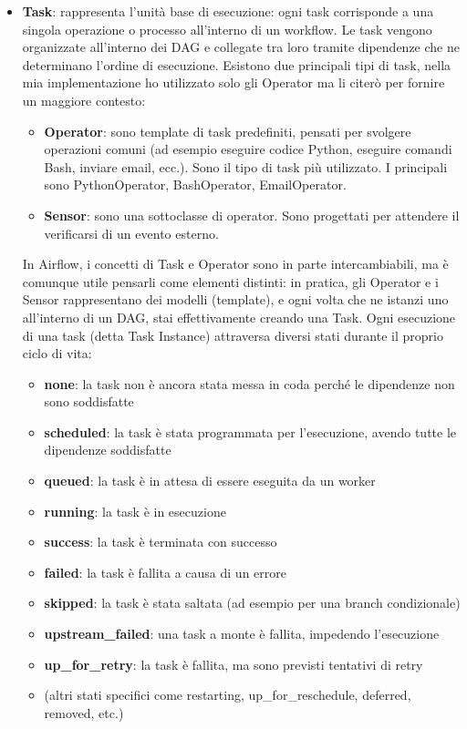 \begin{itemize}
    \item \textbf{Task}: rappresenta l'unità base di esecuzione: ogni task corrisponde a una singola operazione o processo all'interno di un workflow. Le task vengono organizzate all'interno dei DAG e collegate tra loro tramite dipendenze che ne determinano l'ordine di esecuzione. 
    Esistono due principali tipi di task, nella mia implementazione ho utilizzato solo gli Operator ma li citerò per fornire un maggiore contesto:
    \begin{itemize}
        \item \textbf{Operator}: sono template di task predefiniti, pensati per svolgere operazioni comuni (ad esempio eseguire codice Python, eseguire comandi Bash, inviare email, ecc.). Sono il tipo di task più utilizzato. I principali sono PythonOperator, BashOperator, EmailOperator.
        \item \textbf{Sensor}: sono una sottoclasse di operator. Sono progettati per attendere il verificarsi di un evento esterno.
    \end{itemize}

    In Airflow, i concetti di Task e Operator sono in parte intercambiabili, ma è comunque utile pensarli come elementi distinti: in pratica, gli Operator e i Sensor rappresentano dei modelli (template), e ogni volta che ne istanzi uno all'interno di un DAG, stai effettivamente creando una Task.
    Ogni esecuzione di una task (detta Task Instance) attraversa diversi stati durante il proprio ciclo di vita:
    \begin{itemize}
        \item \textbf{none}: la task non è ancora stata messa in coda perché le dipendenze non sono soddisfatte
        \item \textbf{scheduled}: la task è stata programmata per l'esecuzione, avendo tutte le dipendenze soddisfatte
        \item \textbf{queued}: la task è in attesa di essere eseguita da un worker
        \item \textbf{running}: la task è in esecuzione
        \item \textbf{success}: la task è terminata con successo
        \item \textbf{failed}: la task è fallita a causa di un errore
        \item \textbf{skipped}: la task è stata saltata (ad esempio per una branch condizionale)
        \item \textbf{upstream\_failed}: una task a monte è fallita, impedendo l'esecuzione
        \item \textbf{up\_for\_retry}: la task è fallita, ma sono previsti tentativi di retry
        \item (altri stati specifici come restarting, up\_for\_reschedule, deferred, removed, etc.)
    \end{itemize}
\end{itemize}

